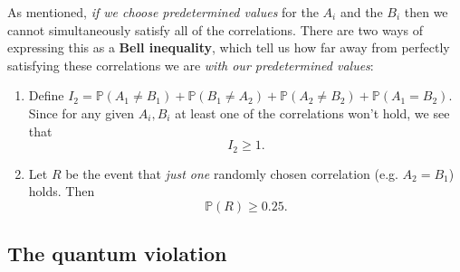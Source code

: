 \documentclass[10pt]{article}
\begin{document}
\begin{itemize}
\begin{enumerate}
                            As mentioned, \emph{if we choose predetermined values} for the $A_i$ and the $B_i$ then we cannot simultaneously satisfy all of the correlations.
                            There are two ways of expressing this as a \textbf{Bell inequality}, which tell us how far away from perfectly satisfying these correlations we are \emph{with our predetermined values}:
                            \begin{enumerate}
                                \item Define $I_2=\mathbb{P}(A_1\neq B_1)+\mathbb{P}(B_1\neq A_2)+\mathbb{P}(A_2\neq B_2)+\mathbb{P}(A_1=B_2)$.
                                    Since for any given $A_i,B_i$ at least one of the correlations won't hold, we see that
                                    \begin{equation*}
                                        I_2\geqslant1.
                                    \end{equation*}
                                \item Let $R$ be the event that \emph{just one} randomly chosen correlation (e.g. $A_2=B_1$) holds.
                                    Then
                                    \begin{equation*}
                                        \mathbb{P}(R)\geqslant0.25.
                                    \end{equation*}
                            \end{enumerate}
                    \end{enumerate}
            \end{itemize}

        \subsection{The quantum violation}
\end{document}
